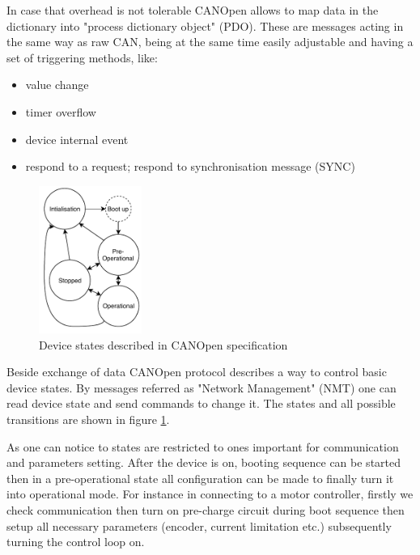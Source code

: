 In case that overhead is not tolerable CANOpen allows to map data in the dictionary into "process dictionary object" (PDO). These are messages acting in the same way as raw CAN, being at the same time easily adjustable and having a set of triggering methods, like:
\begin{itemize}
	\item value change
	\item timer overflow
	\item device internal event
	\item respond to a request; respond to synchronisation message (SYNC)
\end{itemize}

\begin{figure}
    \vspace{-0.9cm}
    \centering
    \includegraphics[width=0.3\textwidth]{figures/CANOpen_NMT}
    \vspace{-0.5cm}
    \caption{Device states described in CANOpen specification}
    \label{fig:CANOpen NMT}
    \vspace{-0.5cm}
\end{figure}
Beside exchange of data CANOpen protocol describes a way to control basic device states. By messages referred as "Network Management" (NMT) one can read device state and send commands to change it. The states and all possible transitions are shown in figure \ref{fig:CANOpen NMT}.

As one can notice to states are restricted to ones important for communication and parameters setting. After the device is on, booting sequence can be started then in a pre-operational state all configuration can be made to finally turn it into operational mode. For instance in connecting to a motor controller, firstly we check communication then turn on pre-charge circuit during boot sequence then setup all necessary parameters (encoder, current limitation etc.) subsequently turning the control loop on.

